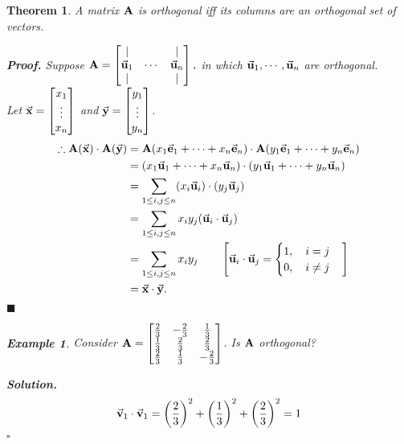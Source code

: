 \documentclass[12pt, a4paper]{article}
\newtheorem{thm}{Theorem}[subsection]
\newtheorem{eg}{Example}[subsection]
\newenvironment*{sol}{\par\indent\textbf{\textit{Solution. }}}{\hfill{$\square$}\par}
\newenvironment*{prf}{\par\indent\textbf{\textit{Proof. }}}{\hfill $\blacksquare$\par}
\def\vecx{\va{x}}
\def\vecy{\va{y}}
\def\vecv{\va{v}}
\def\vecu{\va{u}}
\def\vece{\va{e}}
\def\matrixA{\vb{A}}
\begin{document}
\begin{thm}
	A matrix $\matrixA$ is orthogonal \emph{iff} its columns are an orthogonal set of vectors. \\
	\begin{prf}
		Suppose $\matrixA=\begin{bmatrix}|&&|\\\vecu_1&\cdots&\vecu_n\\|&&|\end{bmatrix},$ in which $\vecu_1,\cdots,\vecu_n$ are orthogonal. \\
		Let $\vecx=\begin{bmatrix}x_1\\\vdots\\x_n\end{bmatrix}$ and $\vecy=\begin{bmatrix}y_1\\\vdots\\y_n\end{bmatrix}$.
		$$\begin{aligned}
			\therefore\matrixA(\vecx)\cdot\matrixA(\vecy)&=\matrixA(x_1\vece_1+\cdots+x_n\vece_n)\cdot\matrixA(y_1\vece_1+\cdots+y_n\vece_n)\\
			&=(x_1\vecu_1+\cdots+x_n\vecu_n)\cdot(y_1\vecu_1+\cdots+y_n\vecu_n)\\
			&=\sum_{1\leq i,j\leq n}(x_i\vecu_i)\cdot (y_j\vecu_j)\\
			&=\sum_{1\leq i,j\leq n}x_iy_j(\vecu_i\cdot\vecu_j)\\
			&=\sum_{1\leq i,j\leq n}x_iy_j\qquad\left[\vecu_i\cdot\vecu_j=\begin{cases}1,\quad i=j\\0,\quad i\neq j\end{cases}\right]\\
			&=\vecx\cdot\vecy.
		\end{aligned}$$
	\end{prf}
	\begin{eg}
		Consider $\matrixA=\begin{bmatrix}\frac{2}{3}&-\frac{2}{3}&\frac{1}{3}\\\frac{1}{3}&\frac{2}{3}&\frac{2}{3}\\\frac{2}{3}&\frac{1}{3}&-\frac{2}{3}\end{bmatrix}$. Is $\matrixA$ orthogonal?\\
		\begin{sol}
			$$\begin{aligned}
				\vecv_1\cdot\vecv_1&=\left(\frac{2}{3}\right)^2+\left(\frac{1}{3}\right)^2+\left(\frac{2}{3}\right)^2=1	\\

\end{aligned}$$
\end{sol}
\end{eg}
\end{thm}
\end{document}
